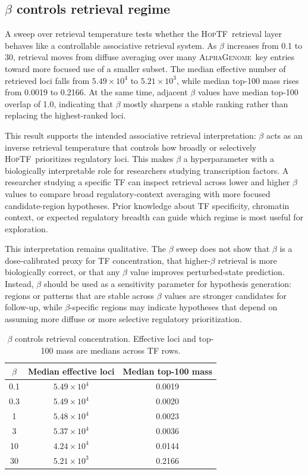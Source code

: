 \documentclass[11pt]{article}
\newcommand{\hoptf}{\textsc{HopTF}}
\newcommand{\ag}{\textsc{AlphaGenome}}
\begin{document}
\subsection{\texorpdfstring{\(\beta\)}{beta} controls retrieval regime}

A sweep over retrieval temperature tests whether the \hoptf\ retrieval layer behaves like a controllable associative retrieval system. As \(\beta\) increases from 0.1 to 30, retrieval moves from diffuse averaging over many \ag\ key entries toward more focused use of a smaller subset. The median effective number of retrieved loci falls from \(5.49\times 10^{4}\) to \(5.21\times 10^{3}\), while median top-100 mass rises from 0.0019 to 0.2166. At the same time, adjacent \(\beta\) values have median top-100 overlap of 1.0, indicating that \(\beta\) mostly sharpens a stable ranking rather than replacing the highest-ranked loci.

This result supports the intended associative retrieval interpretation: \(\beta\) acts as an inverse retrieval temperature that controls how broadly or selectively \hoptf\ prioritizes regulatory loci. This makes \(\beta\) a hyperparameter with a biologically interpretable role for researchers studying transcription factors. A researcher studying a specific TF can inspect retrieval across lower and higher \(\beta\) values to compare broad regulatory-context averaging with more focused candidate-region hypotheses. Prior knowledge about TF specificity, chromatin context, or expected regulatory breadth can guide which regime is most useful for exploration.

This interpretation remains qualitative. The \(\beta\) sweep does not show that \(\beta\) is a dose-calibrated proxy for TF concentration, that higher-\(\beta\) retrieval is more biologically correct, or that any \(\beta\) value improves perturbed-state prediction. Instead, \(\beta\) should be used as a sensitivity parameter for hypothesis generation: regions or patterns that are stable across \(\beta\) values are stronger candidates for follow-up, while \(\beta\)-specific regions may indicate hypotheses that depend on assuming more diffuse or more selective regulatory prioritization.

\begin{table}[H]
\centering
\caption{\(\beta\) controls retrieval concentration. Effective loci and top-100 mass are medians across TF rows.}
\label{tab:beta_sensitivity}
\begin{tabular}{ccc}
\toprule
\(\beta\) & \textbf{Median effective loci} & \textbf{Median top-100 mass} \\
\midrule
0.1 & \(5.49\times 10^{4}\) & 0.0019 \\
0.3 & \(5.49\times 10^{4}\) & 0.0020 \\
1 & \(5.48\times 10^{4}\) & 0.0023 \\
3 & \(5.37\times 10^{4}\) & 0.0036 \\
10 & \(4.24\times 10^{4}\) & 0.0144 \\
30 & \(5.21\times 10^{3}\) & 0.2166 \\
\bottomrule
\end{tabular}
\end{table}
\end{document}
